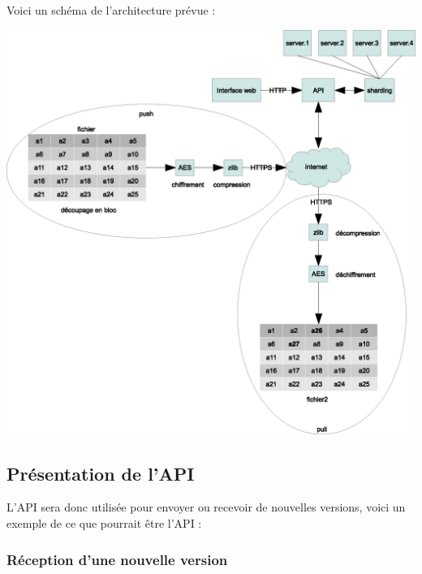 Voici un schéma de l'architecture prévue :

\includegraphics[scale=0.5]{img/architecture.eps}

\subsection{Présentation de l'API}

L'API sera donc utilisée pour envoyer ou recevoir de nouvelles versions, voici un exemple de ce que pourrait être l'API :

\subsubsection{Réception d'une nouvelle version}

